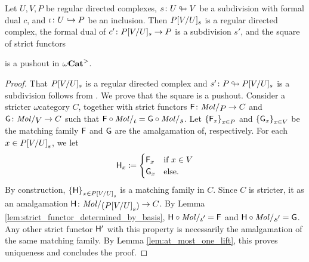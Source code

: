 \begin{lem} \label{lem:generalised_substitution}
    Let \( U, V, P \) be regular directed complexes, \( s \colon U \looparrowright V \) be a subdivision with formal dual \( c \), and \( \iota \colon U \hookrightarrow P \) be an inclusion.
    Then \( P[V/U]_s \) is a regular directed complex, the formal dual of \( c' \colon P[V/U]_s \to P \) is a subdivision \( s' \), and the square of strict functors
    \begin{center}
    \end{center}
    is a pushout in \( {\omega\mathbf{Cat}}^> \).
\end{lem}
\begin{proof}
    That \( P[V/U]_s \) is a regular directed complex and \( s' \colon P \looparrowright P[V/U]_s \) is a subdivision follows from \cite[Proposition 1.46, Comment 1.48]{chanavat2025semistrict}.
    We prove that the square is a pushout.
    Consider a stricter \( \omega \)\nbd category \( C \), together with strict functors \( \F \colon \molecin{P} \to C \) and \( \G \colon \molecin{V} \to C \) such that \( \F \after \molecin{\iota} = \G \after \molecin{s} \).
    Let \( \left\{ {\mathsf{F}_x} \right\}_{x \in P} \) and \( \left\{ {\mathsf{G}_x} \right\}_{x \in V} \) be the matching family \( \mathsf{F} \) and \( \mathsf{G} \) are the amalgamation of, respectively.
    For each \( x \in {P[V/U]}_s \), we let 
    \begin{equation} \label{eq:H_matching_of}
        \mathsf{H}_x \coloneqq 
        \begin{cases}
            \mathsf{F}_x & \text{if } x \in V \\
            \mathsf{G}_x & \text{else}.
        \end{cases}
    \end{equation}
    By construction, \( \left\{ {\mathsf{H}} \right\}_{x \in {P[V/U]}_s} \) is a matching family in \( C \).
    Since \( C \) is stricter, it as an amalgamation \( \fun{H} \colon \molecin{({\subs P V U}_s)} \to C \).
    By Lemma \ref{lem:strict_functor_determined_by_basis}, \( \fun{H} \after \molecin{\iota'} = \F \) and \( \fun{H} \after \molecin{s'} = \G \).
    Any other strict functor \( \mathsf{H}' \) with this property is necessarily the amalgamation of the same matching family.
    By Lemma \ref{lem:at_most_one_lift}, this proves uniqueness and concludes the proof. 
\end{proof}

